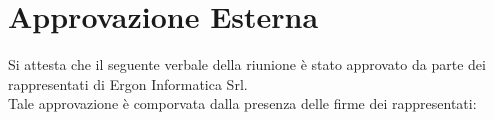 \section{Approvazione Esterna}
Si attesta che il seguente verbale della riunione è stato approvato da parte dei rappresentati di Ergon Informatica Srl.\\
Tale approvazione è comporvata dalla presenza delle firme dei rappresentati:
